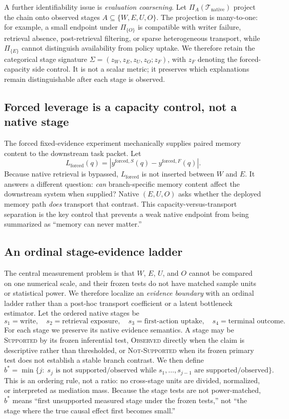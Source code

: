 A further identifiability issue is \emph{evaluation coarsening}. Let $\Pi_A(\mathcal{T}_{\mathrm{native}})$ project the chain onto observed stages $A\subseteq\{W,E,U,O\}$. The projection is many-to-one: for example, a small endpoint under $\Pi_{\{O\}}$ is compatible with writer failure, retrieval absence, post-retrieval filtering, or sparse heterogeneous transport, while $\Pi_{\{E\}}$ cannot distinguish availability from policy uptake. We therefore retain the categorical stage signature $\Sigma=(z_W,z_E,z_U,z_O;z_F)$, with $z_F$ denoting the forced-capacity side control. It is not a scalar metric; it preserves which explanations remain distinguishable after each stage is observed.

\subsection{Forced leverage is a capacity control, not a native stage}
The forced fixed-evidence experiment mechanically supplies paired memory content to the downstream task packet. Let
\[
 L_{\mathrm{forced}}(q)=\left|y^{\mathrm{forced},S}(q)-y^{\mathrm{forced},F}(q)\right|.
\]
Because native retrieval is bypassed, $L_{\mathrm{forced}}$ is not inserted between $W$ and $E$. It answers a different question: \emph{can} branch-specific memory content affect the downstream system when supplied? Native $(E,U,O)$ asks whether the deployed memory path \emph{does} transport that contrast. This capacity-versus-transport separation is the key control that prevents a weak native endpoint from being summarized as ``memory can never matter.''

\subsection{An ordinal stage-evidence ladder}
\label{sec:evidence-ladder}
The central measurement problem is that $W$, $E$, $U$, and $O$ cannot be compared on one numerical scale, and their frozen tests do not have matched sample units or statistical power. We therefore localize an \emph{evidence boundary} with an ordinal ladder rather than a post-hoc transport coefficient or a latent bottleneck estimator. Let the ordered native stages be
\[
  s_1=\text{write},\quad s_2=\text{retrieval exposure},\quad s_3=\text{first-action uptake},\quad s_4=\text{terminal outcome}.
\]
For each stage we preserve its native evidence semantics. A stage may be \textsc{Supported} by its frozen inferential test, \textsc{Observed} directly when the claim is descriptive rather than thresholded, or \textsc{Not-Supported} when its frozen primary test does not establish a stable branch contrast. We then define
\[
  b^*=\min\{j:\;s_j\text{ is not supported/observed while }s_1,\ldots,s_{j-1}\text{ are supported/observed}\}.
\]
This is an ordering rule, not a ratio: no cross-stage units are divided, normalized, or interpreted as mediation mass. Because the stage tests are not power-matched, $b^*$ means ``first unsupported measured stage under the frozen tests,'' not ``the stage where the true causal effect first becomes small.''

